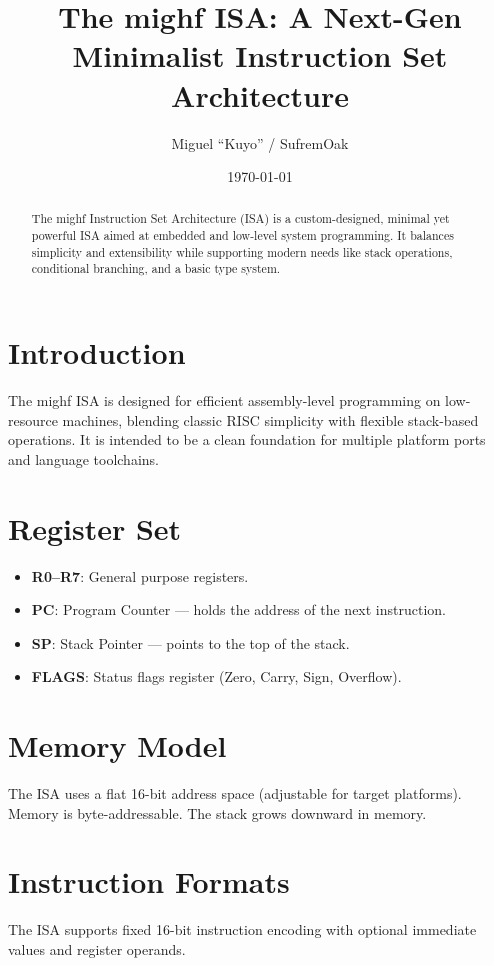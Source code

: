 \documentclass[a4paper,12pt]{article}
\title{The mighf ISA: A Next-Gen Minimalist Instruction Set Architecture}
\author{Miguel “Kuyo” / SufremOak}
\date{\today}
\begin{document}
\maketitle

\begin{abstract}
The mighf Instruction Set Architecture (ISA) is a custom-designed, minimal yet powerful ISA aimed at embedded and low-level system programming. It balances simplicity and extensibility while supporting modern needs like stack operations, conditional branching, and a basic type system.
\end{abstract}

\section{Introduction}
The mighf ISA is designed for efficient assembly-level programming on low-resource machines, blending classic RISC simplicity with flexible stack-based operations. It is intended to be a clean foundation for multiple platform ports and language toolchains.

\section{Register Set}
\begin{itemize}
    \item \textbf{R0--R7}: General purpose registers.
    \item \textbf{PC}: Program Counter — holds the address of the next instruction.
    \item \textbf{SP}: Stack Pointer — points to the top of the stack.
    \item \textbf{FLAGS}: Status flags register (Zero, Carry, Sign, Overflow).
\end{itemize}

\section{Memory Model}
The ISA uses a flat 16-bit address space (adjustable for target platforms). Memory is byte-addressable. The stack grows downward in memory.

\section{Instruction Formats}
The ISA supports fixed 16-bit instruction encoding with optional immediate values and register operands.
\end{document}
